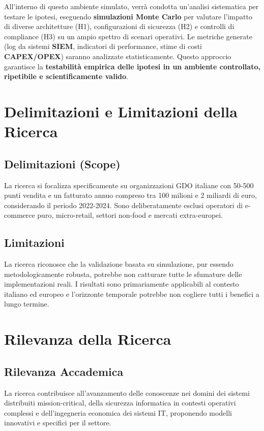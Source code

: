 All'interno di questo ambiente simulato, verrà condotta un'analisi sistematica per testare le ipotesi, eseguendo \textbf{simulazioni Monte Carlo} per valutare l'impatto di diverse architetture (H1), configurazioni di sicurezza (H2) e controlli di compliance (H3) su un ampio spettro di scenari operativi. Le metriche generate (log da sistemi \textbf{SIEM}, indicatori di performance, stime di costi \textbf{CAPEX/OPEX}) saranno analizzate statisticamente. Questo approccio garantisce la \textbf{testabilità empirica delle ipotesi in un ambiente controllato, ripetibile e scientificamente valido}.

\section{Delimitazioni e Limitazioni della Ricerca}

\subsection{Delimitazioni (Scope)}
La ricerca si focalizza specificamente su organizzazioni GDO italiane con 50-500 punti vendita e un fatturato annuo compreso tra 100 milioni e 2 miliardi di euro, considerando il periodo 2022-2024. Sono deliberatamente esclusi operatori di e-commerce puro, micro-retail, settori non-food e mercati extra-europei.

\subsection{Limitazioni}
La ricerca riconosce che la validazione basata su simulazione, pur essendo metodologicamente robusta, potrebbe non catturare tutte le sfumature delle implementazioni reali. I risultati sono primariamente applicabili al contesto italiano ed europeo e l'orizzonte temporale potrebbe non cogliere tutti i benefici a lungo termine.

\section{Rilevanza della Ricerca}
\subsection{Rilevanza Accademica}
La ricerca contribuisce all'avanzamento delle conoscenze nei domini dei sistemi distribuiti mission-critical, della sicurezza informatica in contesti operativi complessi e dell'ingegneria economica dei sistemi IT, proponendo modelli innovativi e specifici per il settore.

